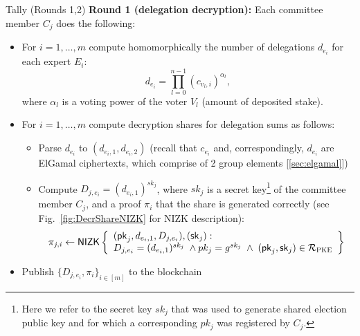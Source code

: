 \begin{boxfig}{\label{fig:tally1}Tally (Rounds 1,2)}{}
\textbf{Round 1 (delegation decryption):}
Each committee member $C_j$ does the following:
\begin{itemize}
    \item For $i = 1,\ldots, m$ compute homomorphically the number of delegations $d_{e_i}$ for each expert $E_i$:
    \[d_{e_i}=\prod_{l=0}^{n-1} (c_{v_l,i})^{\alpha_l},\]
    where $\alpha_l$ is a voting power of the voter $V_l$ (amount of deposited stake). 
    \item For $i = 1,\ldots, m$ compute decryption shares for delegation sums as follows:
    \begin{itemize}
        \item Parse $d_{e_i}$ to $(d_{e_i,1}, d_{e_i,2})$ (recall that $c_{e_i}$ and, correspondingly, $d_{e_i}$ are ElGamal ciphertexts, which comprise of 2 group elements [\ref{sec:elgamal}])
        \item Compute $D_{j,e_i}=(d_{e_i,1})^{sk_j}$, where $sk_j$ is a secret key\footnote{Here we refer to the secret key $sk_j$ that was used to generate shared election public key and for which a corresponding $pk_j$ was registered by $C_j$.} of the committee member $C_j$, and a proof $\pi_i$ that the share is generated correctly (see Fig.~\ref{fig:DecrShareNIZK} for NIZK description):
        \begin{equation*}
        \pi_{j,i}\leftarrow\mathsf{NIZK}\left\{\begin{array}{l} (\mathsf{pk}_j, d_{e_i,1}, D_{j,e_i}),(\mathsf{sk}_j): \\
         D_{j,e_i}=(d_{e_i,1})^{sk_j} \; \wedge pk_j=g^{sk_j} \; \wedge \;  (\mathsf{pk}_j,\mathsf{sk}_j)\in\mathcal{R}_{\textsc{PKE}} \end{array}\right\}
        \end{equation*}
    \end{itemize}
    \item Publish $\{D_{j,e_i}, \pi_i\}_{i \in [m]}$ to the blockchain
\end{itemize}


\end{boxfig}
